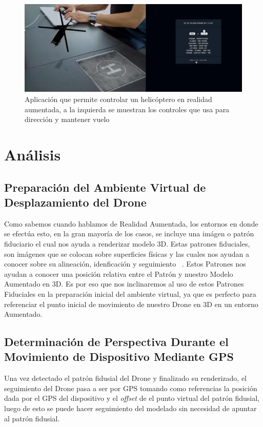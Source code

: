 \documentclass[a4paper]{article}
\begin{document}
\begin{figure}[h!]
  \centering
  \includegraphics[width=0.95\linewidth, keepaspectratio]{helicopteroAR}
  \caption{Aplicación que permite controlar un helicóptero en realidad aumentada, a la izquierda se muestran los controles que usa para dirección y mantener vuelo}
  \label{fig:Helicoptero AR}
\end{figure}

\section{Análisis}
\subsection{Preparación del Ambiente Virtual de Desplazamiento del Drone}
Como sabemos cuando hablamos de Realidad Aumentada, los entornos en donde se efectúa esto, en la gran mayoría de los casos, se incluye una imágen o patrón fiduciario el cual nos ayuda a renderizar modelo 3D. Estas patrones fiduciales, son imágenes que se colocan sobre superficies físicas y las cuales nos ayudan a conocer sobre su alineación, idenficación y seguimiento ~\cite{bestfiducial}. Estos Patrones nos ayudan a conocer una posición relativa entre el Patrón y nuestro Modelo Aumentado en 3D. Es por eso que nos inclinaremos al uso de estos Patrones Fiduciales en la preparación inicial del ambiente virtual, ya que es perfecto para referenciar el punto inicial de movimiento de nuestro Drone en 3D en un entorno Aumentado.

\subsection{Determinación de Perspectiva Durante el Movimiento de Dispositivo Mediante GPS}
Una vez detectado el patrón fidusial del Drone y finalizado su renderizado, el seguimiento del Drone pasa a ser por GPS tomando como referencias la posición dada por el GPS del dispositivo y el \textit{offset} de el punto virtual del patrón fidusial, luego de esto se puede hacer seguimiento del modelado sin necesidad de apuntar al patrón fidusial.
\end{document}
